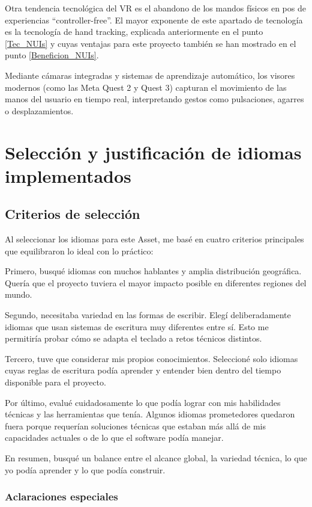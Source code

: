 Otra tendencia tecnológica del VR es el abandono de los mandos físicos en pos de experiencias ``controller-free''. El mayor exponente de este apartado de tecnología es la tecnología de hand tracking, explicada anteriormente en el punto \ref{Tec_NUIs} y cuyas ventajas para este proyecto también se han mostrado en el punto \ref{Beneficion_NUIs}.

Mediante cámaras integradas y sistemas de aprendizaje automático, los visores modernos (como las Meta Quest 2 y Quest 3) capturan el movimiento de las manos del usuario en tiempo real, interpretando gestos como pulsaciones, agarres o desplazamientos.

\section{Selección y justificación de idiomas implementados}

\subsection{Criterios de selección}

Al seleccionar los idiomas para este Asset, me basé en cuatro criterios principales que equilibraron lo ideal con lo práctico:

Primero, busqué idiomas con muchos hablantes y amplia distribución geográfica. Quería que el proyecto tuviera el mayor impacto posible en diferentes regiones del mundo.

Segundo, necesitaba variedad en las formas de escribir. Elegí deliberadamente idiomas que usan sistemas de escritura muy diferentes entre sí. Esto me permitiría probar cómo se adapta el teclado a retos técnicos distintos.

Tercero, tuve que considerar mis propios conocimientos. Seleccioné solo idiomas cuyas reglas de escritura podía aprender y entender bien dentro del tiempo disponible para el proyecto.

Por último, evalué cuidadosamente lo que podía lograr con mis habilidades técnicas y las herramientas que tenía. Algunos idiomas prometedores quedaron fuera porque requerían soluciones técnicas que estaban más allá de mis capacidades actuales o de lo que el software podía manejar.

En resumen, busqué un balance entre el alcance global, la variedad técnica, lo que yo podía aprender y lo que podía construir.

\subsubsection{Aclaraciones especiales}

